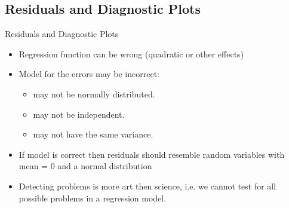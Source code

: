 \documentclass[aspectratio=169]{beamer}\usepackage[]{graphicx}\usepackage[]{color}
\begin{document}
\subsection{Residuals and Diagnostic Plots}
\begin{frame}{Residuals and Diagnostic Plots}
  \begin{itemize}
		\item Regression function can be wrong (quadratic or other effects)
		\item Model for the errors may be incorrect:
		\begin{itemize}
			\item may not be normally distributed.
			\item may not be independent.
			\item may not have the same variance.
		\end{itemize}
		\item If model is correct then residuals should resemble random variables with mean = 0 and a normal distribution
		\item Detecting problems is more art then science, i.e. we cannot test for all possible problems in a regression model.
	\end{itemize}
\end{frame}
\end{document}
